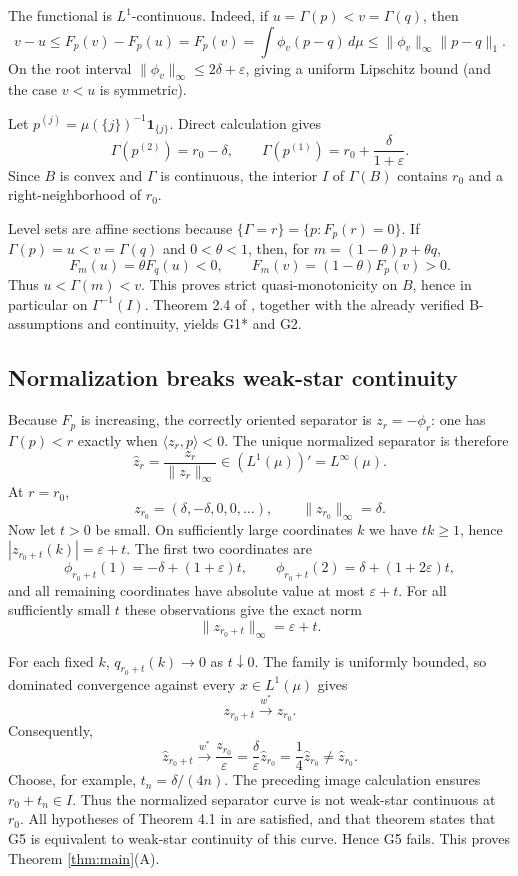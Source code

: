 \documentclass[11pt]{article}
\newcommand{\1}{\mathbf 1}
\begin{document}
The functional is $L^1$-continuous.  Indeed, if
$u=\Gamma(p)<v=\Gamma(q)$, then
\[
 v-u\leq F_p(v)-F_p(u)=F_p(v)
 =\int\phi_v(p-q)\,d\mu
 \leq \|\phi_v\|_\infty\|p-q\|_1.
\]
On the root interval $\|\phi_v\|_\infty\leq2\delta+\varepsilon$, giving a
uniform Lipschitz bound (and the case $v<u$ is symmetric).

Let $p^{(j)}=\mu(\{j\})^{-1}\1_{\{j\}}$.  Direct calculation gives
\[
 \Gamma(p^{(2)})=r_0-\delta,
 \qquad
 \Gamma(p^{(1)})=r_0+\frac{\delta}{1+\varepsilon}.
\]
Since $B$ is convex and $\Gamma$ is continuous, the interior $I$ of
$\Gamma(B)$ contains $r_0$ and a right-neighborhood of $r_0$.

Level sets are affine sections because
$\{\Gamma=r\}=\{p:F_p(r)=0\}$.  If
$\Gamma(p)=u<v=\Gamma(q)$ and $0<\theta<1$, then, for
$m=(1-\theta)p+\theta q$,
\[
 F_m(u)=\theta F_q(u)<0,
 \qquad
 F_m(v)=(1-\theta)F_p(v)>0.
\]
Thus $u<\Gamma(m)<v$.  This proves strict quasi-monotonicity on $B$, hence in
particular on $\Gamma^{-1}(I)$.  Theorem 2.4 of \cite{Steinwart2015}, together
with the already verified B-assumptions and continuity, yields G1* and G2.

\subsection{Normalization breaks weak-star continuity}

Because $F_p$ is increasing, the correctly oriented separator is
$z_r=-\phi_r$: one has $\Gamma(p)<r$ exactly when
$\langle z_r,p\rangle<0$.  The unique normalized separator is therefore
\[
 \widehat z_r=\frac{z_r}{\|z_r\|_\infty}\in(L^1(\mu))'=L^\infty(\mu).
\]
At $r=r_0$,
\[
 z_{r_0}=(\delta,-\delta,0,0,\ldots),
 \qquad \|z_{r_0}\|_\infty=\delta.
\]
Now let $t>0$ be small.  On sufficiently large coordinates $k$ we have
$tk\geq1$, hence $|z_{r_0+t}(k)|=\varepsilon+t$.  The first two coordinates
are
\[
 \phi_{r_0+t}(1)=-\delta+(1+\varepsilon)t,
 \qquad
 \phi_{r_0+t}(2)=\delta+(1+2\varepsilon)t,
\]
and all remaining coordinates have absolute value at most $\varepsilon+t$.
For all sufficiently small $t$ these observations give the exact norm
\[
 \|z_{r_0+t}\|_\infty=\varepsilon+t.
\]

For each fixed $k$, $q_{r_0+t}(k)\to0$ as $t\downarrow0$.  The family is
uniformly bounded, so dominated convergence against every $x\in L^1(\mu)$
gives
\[
 z_{r_0+t}\overset{w^*}{\longrightarrow}z_{r_0}.
\]
Consequently,
\[
 \widehat z_{r_0+t}
 \overset{w^*}{\longrightarrow}
 \frac{z_{r_0}}{\varepsilon}
 =\frac{\delta}{\varepsilon}\widehat z_{r_0}
 =\frac14\widehat z_{r_0}
 \neq\widehat z_{r_0}.
\]
Choose, for example, $t_n=\delta/(4n)$.  The preceding image calculation
ensures $r_0+t_n\in I$.  Thus the normalized separator curve is not weak-star
continuous at $r_0$.  All hypotheses of Theorem 4.1 in
\cite{Steinwart2015} are satisfied, and that theorem states that G5 is
equivalent to weak-star continuity of this curve.  Hence G5 fails.  This proves
Theorem \ref{thm:main}(A).
\end{document}

